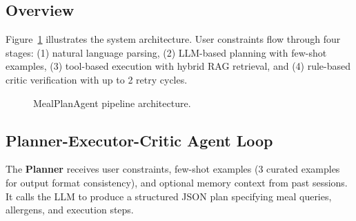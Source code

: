 \documentclass[11pt,twocolumn]{article}
\begin{document}
\subsection{Overview}

Figure~\ref{fig:architecture} illustrates the system architecture. User constraints flow through four stages: (1) natural language parsing, (2) LLM-based planning with few-shot examples, (3) tool-based execution with hybrid RAG retrieval, and (4) rule-based critic verification with up to 2 retry cycles.

\begin{figure}[H]
\centering
{}
\caption{MealPlanAgent pipeline architecture.}
\label{fig:architecture}
\end{figure}

\subsection{Planner-Executor-Critic Agent Loop}

The \textbf{Planner} receives user constraints, few-shot examples (3 curated examples for output format consistency), and optional memory context from past sessions. It calls the LLM to produce a structured JSON plan specifying meal queries, allergens, and execution steps.
\end{document}
